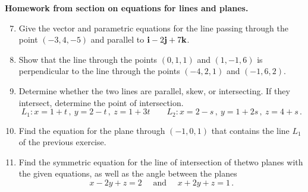 \documentclass[12pt]{article}
\newcommand{\bfi}{{\bf i}}    %
\newcommand{\bfj}{{\bf j}}    %
\newcommand{\bfk}{{\bf k}}    %
\begin{document}
{\bf {\color{Maroon}Homework from section on equations for lines and planes.}}
\begin{enumerate}  %
\setcounter{enumi}{6}

\item Give the vector and parametric equations for the line passing through the point $(-3,4,-5)$ and parallel to
  $\bfi -2\bfj +7\bfk$.

\item Show that the line through the points $(0,1,1)$ and $(1,-1,6)$ is perpendicular to the line  through the points 
  $(-4,2,1)$ and $(-1,6,2)$.

\item Determine whether the two lines are parallel, skew, or intersecting.  If they intersect, determine the point of
  intersection.\vspace{-5pt}
  \[
  L_1\colon x=1+t\,,\ y=2-t\,,\  z=1+3t\qquad
  L_2\colon x=2-s\,,\ y=1+2s\,,\ z=4+s\,.
  \]

\item Find the equation for the plane through $(-1,0,1)$ that contains the line $L_1$ of the previous exercise.

\item  Find the symmetric equation for the line of intersection of thetwo  planes with the given equations, as well as the angle between the
  planes\vspace{-5pt} 
  \[
  x-2y+z=2\quad\mbox{ and }\quad x+2y+z=1\,.
  \]


\end{enumerate}
\end{document}
